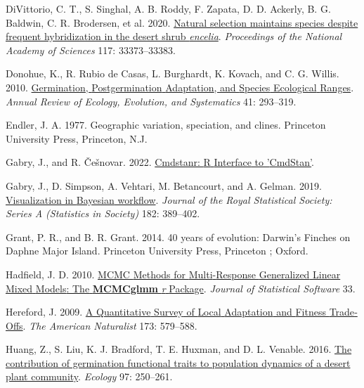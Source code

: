 \documentclass[
  12pt,
]{article}
\newlength{\cslhangindent}
\newlength{\cslentryspacingunit} %
\newenvironment{CSLReferences}[2] %
 {%
  \setlength{\parindent}{0pt}
  \ifodd #1
  \let\oldpar\par
  \def\par{\hangindent=\cslhangindent\oldpar}
  \fi
  \setlength{\parskip}{#2\cslentryspacingunit}
 }%
 {}
\begin{document}
\begin{CSLReferences}{1}{0}
\leavevmode{}%
DiVittorio, C. T., S. Singhal, A. B. Roddy, F. Zapata, D. D. Ackerly, B. G. Baldwin, C. R. Brodersen, et al. 2020. \href{https://doi.org/10.1073/pnas.2001337117}{Natural selection maintains species despite frequent hybridization in the desert shrub \emph{encelia}}. \emph{Proceedings of the National Academy of Sciences} 117: 33373--33383.

\leavevmode{}%
Donohue, K., R. Rubio de Casas, L. Burghardt, K. Kovach, and C. G. Willis. 2010. \href{https://doi.org/10.1146/annurev-ecolsys-102209-144715}{Germination, {Postgermination} {Adaptation}, and {Species} {Ecological} {Ranges}}. \emph{Annual Review of Ecology, Evolution, and Systematics} 41: 293--319.

\leavevmode{}%
Endler, J. A. 1977. Geographic variation, speciation, and clines. Princeton University Press, Princeton, N.J.

\leavevmode{}%
Gabry, J., and R. Češnovar. 2022. \href{https://mc-stan.org/cmdstanr,\%20https://discourse.mc-stan.org}{Cmdstanr: {R} {Interface} to '{CmdStan}'}.

\leavevmode{}%
Gabry, J., D. Simpson, A. Vehtari, M. Betancourt, and A. Gelman. 2019. \href{https://doi.org/10.1111/rssa.12378}{Visualization in {Bayesian} workflow}. \emph{Journal of the Royal Statistical Society: Series A (Statistics in Society)} 182: 389--402.

\leavevmode{}%
Grant, P. R., and B. R. Grant. 2014. 40 years of evolution: {Darwin}'s {Finches} on {Daphne} {Major} {Island}. Princeton University Press, Princeton ; Oxford.

\leavevmode{}%
Hadfield, J. D. 2010. \href{https://doi.org/10.18637/jss.v033.i02}{{MCMC} {Methods} for {Multi}-{Response} {Generalized} {Linear} {Mixed} {Models}: {The} \textbf{MCMCglmm} \emph{r} {Package}}. \emph{Journal of Statistical Software} 33.

\leavevmode{}%
Hereford, J. 2009. \href{https://doi.org/10.1086/597611}{A {Quantitative} {Survey} of {Local} {Adaptation} and {Fitness} {Trade}‐{Offs}}. \emph{The American Naturalist} 173: 579--588.

\leavevmode{}%
Huang, Z., S. Liu, K. J. Bradford, T. E. Huxman, and D. L. Venable. 2016. \href{https://doi.org/10.1890/15-0744.1}{The contribution of germination functional traits to population dynamics of a desert plant community}. \emph{Ecology} 97: 250--261.


\end{CSLReferences}
\end{document}
